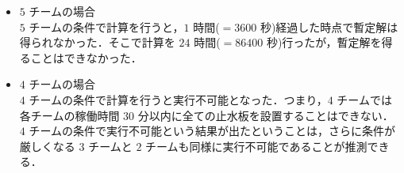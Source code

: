 \documentclass[a4paper,12pt,fleqn]{jarticle}
\begin{document}
\begin{itemize}
\begin{itemize}
\item $5$ チームの場合 \\
$5$ チームの条件で計算を行うと，$1$ 時間($=3600$ 秒)経過した時点で暫定解は得られなかった．そこで計算を $24$ 時間($=86400$ 秒)行ったが，暫定解を得ることはできなかった．
\end{itemize}

\begin{itemize}
\item $4$ チームの場合 \\
$4$ チームの条件で計算を行うと実行不可能となった．つまり，$4$ チームでは各チームの稼働時間 $30$ 分以内に全ての止水板を設置することはできない．\\
$4$ チームの条件で実行不可能という結果が出たということは，さらに条件が厳しくなる $3$ チームと $2$ チームも同様に実行不可能であることが推測できる．
\end{itemize}

\begin{table}[H]
  \begin{center}
    \caption{実験 $1-1$ の計算結果}
    \label{実験1_1_3}
  \end{center}
\end{table}
\end{itemize}
\end{document}
